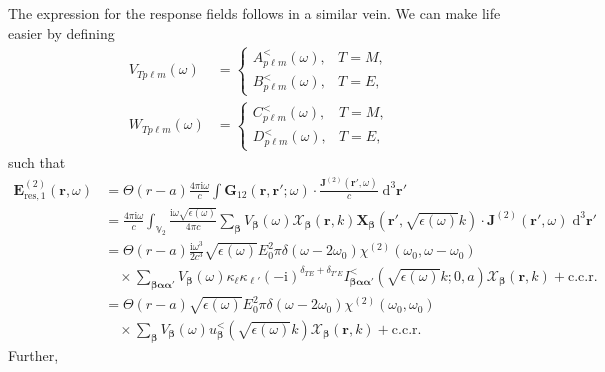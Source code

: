 \documentclass{article}
\begin{document}
The expression for the response fields follows in a similar vein. We can make life easier by defining
\begin{equation}
\begin{split}
V_{Tp\ell m}(\omega) &= 
\begin{cases}
A_{p\ell m}^<(\omega), & T = M,\\
B_{p\ell m}^<(\omega), & T = E,
\end{cases}\\
W_{Tp\ell m}(\omega) &=
\begin{cases}
C_{p\ell m}^<(\omega), & T = M,\\
D_{p\ell m}^<(\omega), & T = E,
\end{cases}
\end{split}
\end{equation}
such that
\begin{equation}
\begin{split}
\mathbf{E}_{\mathrm{res},1}^{(2)}(\mathbf{r},\omega) &= \Theta(r - a)\frac{4\pi\mathrm{i}\omega}{c}\int\mathbf{G}_{12}(\mathbf{r},\mathbf{r}';\omega)\cdot\frac{\mathbf{J}^{(2)}(\mathbf{r}',\omega)}{c}\;\mathrm{d}^3\mathbf{r}'\\
&= \frac{4\pi\mathrm{i}\omega}{c}\int_{\mathbb{V}_2}\frac{\mathrm{i}\omega\sqrt{\epsilon(\omega)}}{4\pi c}\sum_{\bm{\beta}}V_{\bm{\beta}}(\omega)\bm{\mathcal{X}}_{\bm{\beta}}(\mathbf{r},k)\mathbf{X}_{\bm{\beta}}\!\left(\mathbf{r}',\sqrt{\epsilon(\omega)}k\right)\cdot\mathbf{J}^{(2)}(\mathbf{r}',\omega)\;\mathrm{d}^3\mathbf{r}'\\
&= \Theta(r - a)\frac{\mathrm{i}\omega^3}{2c^3}\sqrt{\epsilon(\omega)}E_0^2\pi\delta(\omega - 2\omega_0)\chi^{(2)}(\omega_0,\omega - \omega_0)\\
&\quad\times\sum_{\bm{\beta}\bm{\alpha}\bm{\alpha}'}V_{\bm{\beta}}(\omega)\kappa_\ell\kappa_{\ell'}(-\mathrm{i})^{\delta_{TE} + \delta_{T'E}}I_{\bm{\beta}\bm{\alpha}\bm{\alpha}'}^<\!\left(\sqrt{\epsilon(\omega)}k;0,a\right)\bm{\mathcal{X}}_{\bm{\beta}}(\mathbf{r},k) + \mathrm{c.c.r.}\\[1.0em]
&= \Theta(r - a)\sqrt{\epsilon(\omega)}E_0^2\pi\delta(\omega - 2\omega_0)\chi^{(2)}(\omega_0,\omega_0)\\
&\quad\times\sum_{\bm{\beta}}V_{\bm{\beta}}(\omega)u_{\bm{\beta}}^<\!\left(\sqrt{\epsilon(\omega)}k\right)\bm{\mathcal{X}}_{\bm{\beta}}(\mathbf{r},k) + \mathrm{c.c.r.}
\end{split}
\end{equation}
Further, 
\end{document}
